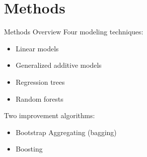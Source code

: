 \documentclass{beamer}
\begin{document}
	\section{Methods}
	
	\begin{frame}{Methods Overview}
		Four modeling techniques:
		\begin{itemize}
			\item Linear models
			\item Generalized additive models
			\item Regression trees
			\item Random forests
		\end{itemize}
		Two improvement algorithms:
		\begin{itemize}
			\item Bootstrap Aggregating (bagging)
			\item Boosting
		\end{itemize}
	\end{frame}
\end{document}
